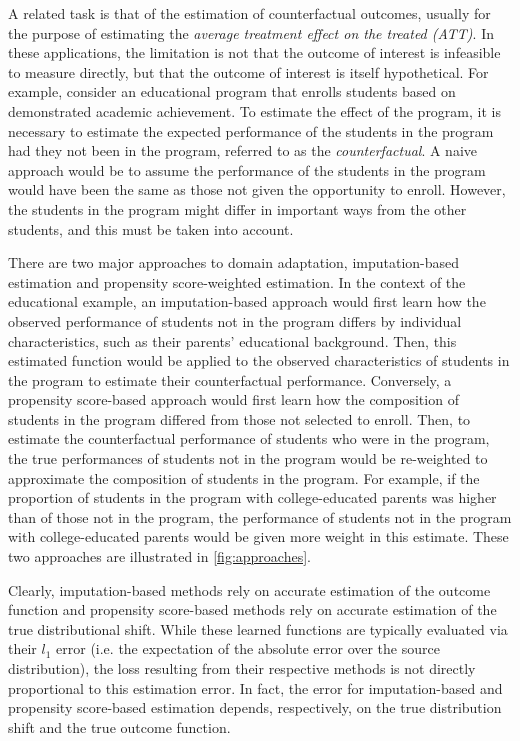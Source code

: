 \documentclass{article} %
\begin{document}
A related task is that of the estimation of counterfactual outcomes, usually for the purpose of estimating the \emph{average treatment effect on the treated (ATT)}. In these applications, the limitation is not that the outcome of interest is infeasible to measure directly, but that the outcome of interest is itself hypothetical. For example, consider an educational program that enrolls students based on demonstrated academic achievement. To estimate the effect of the program, it is necessary to estimate the expected performance of the students in the program had they not been in the program, referred to as the \emph{counterfactual}. A naive approach would be to assume the performance of the students in the program would have been the same as those not given the opportunity to enroll. However, the students in the program might differ in important ways from the other students, and this must be taken into account.

There are two major approaches to domain adaptation, imputation-based estimation and propensity score-weighted estimation. In the context of the educational example, an imputation-based approach would first learn how the observed performance of students not in the program differs by individual characteristics, such as their parents' educational background. Then, this estimated function would be applied to the observed characteristics of students in the program to estimate their counterfactual performance. Conversely, a propensity score-based approach would first learn how the composition of students in the program differed from those not selected to enroll. Then, to estimate the counterfactual performance of students who were in the program, the true performances of students not in the program would be re-weighted to approximate the composition of students in the program. For example, if the proportion of students in the program with college-educated parents was higher than of those not in the program, the performance of students not in the program with college-educated parents would be given more weight in this estimate. These two approaches are illustrated in \ref{fig:approaches}.

Clearly, imputation-based methods rely on accurate estimation of the outcome function and propensity score-based methods rely on accurate estimation of the true distributional shift. While these learned functions are typically evaluated via their $l_1$ error (i.e. the expectation of the absolute error over the source distribution), the loss resulting from their respective methods is not directly proportional to this estimation error. In fact, the error for imputation-based and propensity score-based estimation depends, respectively, on the true distribution shift and the true outcome function. 
\end{document}
